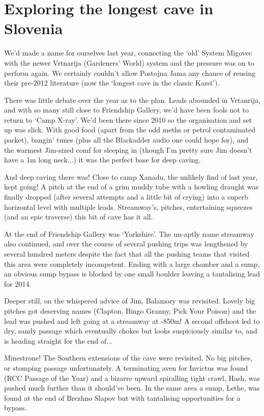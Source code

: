 \section{Exploring the longest cave in Slovenia}

We’d made a name for ourselves last year, connecting the ‘old’ System Migovec with the newer Vrtnarija (Gardeners’ World) system and the pressure was on to perform again. We certainly couldn’t allow Postojna Jama any chance of reusing their pre-2012 literature (now the ‘longest cave in the classic Karst’). 

There was little debate over the year as to the plan. Leads abounded in Vrtanrija, and with so many still close to Friendship Gallery, we’d have been fools not to return to ‘Camp X-ray’. We’d been there since 2010 so the organisation and set up was slick. With good food (apart from the odd meths or petrol contaminated packet), bangin’ tunes (plus all the Blackadder audio one could hope for), and the warmest Jim-sized comf for sleeping in (though I’m pretty sure Jim doesn’t have a 1m long neck...) it was the perfect base for deep caving.

And deep caving there was! Close to camp Xanadu, the unlikely find of last year, kept going! A pitch at the end of a grim muddy tube with a howling draught was finally dropped (after several attempts and a little bit of crying) into a superb horizontal level with multiple leads. Streamway’s, pitches, entertaining squeezes (and an epic traverse) this bit of cave has it all.

At the end of Friendship Gallery was ‘Yorkshire’. The un-aptly name streamway also continued, and over the course of several pushing trips was lengthened by several hundred meters despite the fact that all the pushing teams that visited this area were completely incompetent. Ending with a large chamber and a sump, an obvious sump bypass is blocked by one small boulder leaving a tantalising lead for 2014.

Deeper still, on the whispered advice of Jim, Balamory was revisited. Lovely big pitches got deserving names (Clapton, Bingo Granny, Pick Your Poison) and the lead was pushed and left going at a streamway at -850m! A second offshoot led to dry, sandy passage which eventually chokes but looks suspiciously similar to, and is heading straight for the end of...

Minestrone! The Southern extensions of the cave were revisited. No big pitches, or stomping passage unfortunately. A terminating aven for Invictus was found (RCC Passage of the Year) and a bizarre upward spiralling tight crawl, Hash, was pushed much further than it should’ve been. In the same area a sump, Lethe, was found at the end of Brezhno Slapov but with tantalising opportunities for a bypass.

